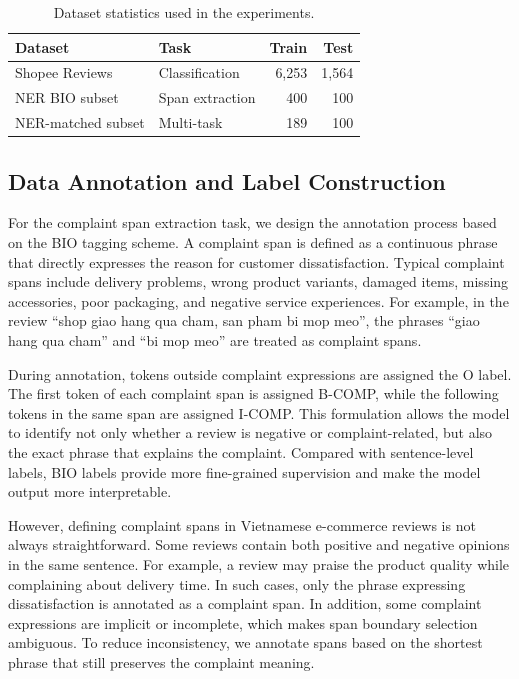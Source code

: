 \documentclass[11pt]{article}
\begin{document}
\begin{table}[t]
\centering
\small
\begin{tabular}{llrr}
\toprule
Dataset & Task & Train & Test \\
\midrule
Shopee Reviews & Classification & 6,253 & 1,564 \\
NER BIO subset & Span extraction & 400 & 100 \\
NER-matched subset & Multi-task & 189 & 100 \\
\bottomrule
\end{tabular}
\caption{Dataset statistics used in the experiments.}
\label{tab:dataset}
\end{table}

\subsection{Data Annotation and Label Construction}

For the complaint span extraction task, we design the annotation process based on the BIO tagging scheme. A complaint span is defined as a continuous phrase that directly expresses the reason for customer dissatisfaction. Typical complaint spans include delivery problems, wrong product variants, damaged items, missing accessories, poor packaging, and negative service experiences. For example, in the review ``shop giao hang qua cham, san pham bi mop meo'', the phrases ``giao hang qua cham'' and ``bi mop meo'' are treated as complaint spans.

During annotation, tokens outside complaint expressions are assigned the O label. The first token of each complaint span is assigned B-COMP, while the following tokens in the same span are assigned I-COMP. This formulation allows the model to identify not only whether a review is negative or complaint-related, but also the exact phrase that explains the complaint. Compared with sentence-level labels, BIO labels provide more fine-grained supervision and make the model output more interpretable.

However, defining complaint spans in Vietnamese e-commerce reviews is not always straightforward. Some reviews contain both positive and negative opinions in the same sentence. For example, a review may praise the product quality while complaining about delivery time. In such cases, only the phrase expressing dissatisfaction is annotated as a complaint span. In addition, some complaint expressions are implicit or incomplete, which makes span boundary selection ambiguous. To reduce inconsistency, we annotate spans based on the shortest phrase that still preserves the complaint meaning.
\end{document}
